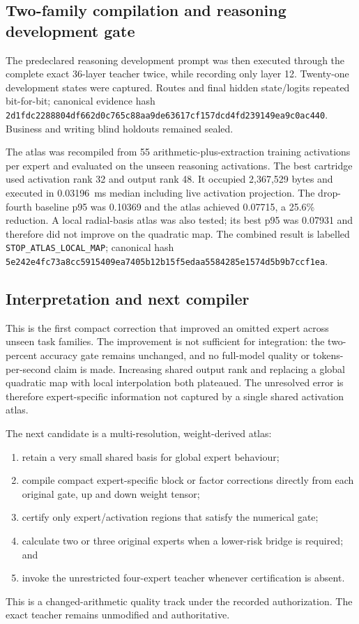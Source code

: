 \subsection{Two-family compilation and reasoning development gate}

The predeclared reasoning development prompt was then executed through the
complete exact 36-layer teacher twice, while recording only layer 12.  Twenty-one
development states were captured.  Routes and final hidden state/logits repeated
bit-for-bit; canonical evidence hash
\texttt{2d1fdc2288804df662d0c765c88aa9de63617cf157dcd4fd239149ea9c0ac440}.
Business and writing blind holdouts remained sealed.

The atlas was recompiled from 55 arithmetic-plus-extraction training
activations per expert and evaluated on the unseen reasoning activations.  The
best cartridge used activation rank 32 and output rank 48.  It occupied
2,367,529 bytes and executed in 0.03196~ms median including live activation
projection.  The drop-fourth baseline p95 was 0.10369 and the atlas achieved
0.07715, a 25.6\% reduction.  A local radial-basis atlas was also tested; its best
p95 was 0.07931 and therefore did not improve on the quadratic map.  The combined
result is labelled \texttt{STOP\_ATLAS\_LOCAL\_MAP}; canonical hash
\texttt{5e242e4fc73a8cc5915409ea7405b12b15f5edaa5584285e1574d5b9b7ccf1ea}.

\subsection{Interpretation and next compiler}

This is the first compact correction that improved an omitted expert across
unseen task families.  The improvement is not sufficient for integration: the
two-percent accuracy gate remains unchanged, and no full-model quality or
tokens-per-second claim is made.  Increasing shared output rank and replacing a
global quadratic map with local interpolation both plateaued.  The unresolved
error is therefore expert-specific information not captured by a single shared
activation atlas.

The next candidate is a multi-resolution, weight-derived atlas:
\begin{enumerate}
  \item retain a very small shared basis for global expert behaviour;
  \item compile compact expert-specific block or factor corrections directly
        from each original gate, up and down weight tensor;
  \item certify only expert/activation regions that satisfy the numerical gate;
  \item calculate two or three original experts when a lower-risk bridge is
        required; and
  \item invoke the unrestricted four-expert teacher whenever certification is
        absent.
\end{enumerate}
This is a changed-arithmetic quality track under the recorded authorization.
The exact teacher remains unmodified and authoritative.
